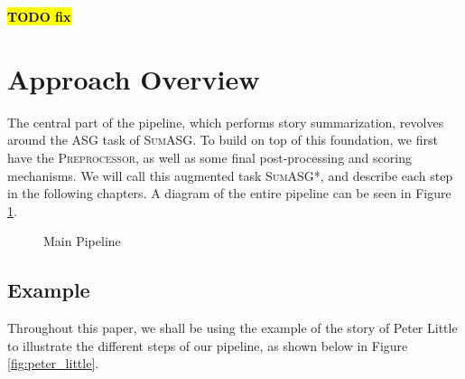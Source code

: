 \textcolor{red}{\textbf{\hl{TODO fix}}}

\section{Approach Overview}

The central part of the pipeline, which performs story summarization, revolves around the ASG task of \textsc{SumASG}. To build on top of this foundation, we first have the \textsc{Preprocessor}, as well as some final post-processing and scoring mechanisms. We will call this augmented task \textsc{SumASG*}, and describe each step in the following chapters. A diagram of the entire pipeline can be seen in Figure \ref{fig:main_pipeline}.

\begin{figure}[H]
\centering
{}
\caption{Main Pipeline}
\label{fig:main_pipeline}
\end{figure}

\subsection{Example}

Throughout this paper, we shall be using the example of the story of Peter Little to illustrate the different steps of our pipeline, as shown below in Figure \ref{fig:peter_little}.

